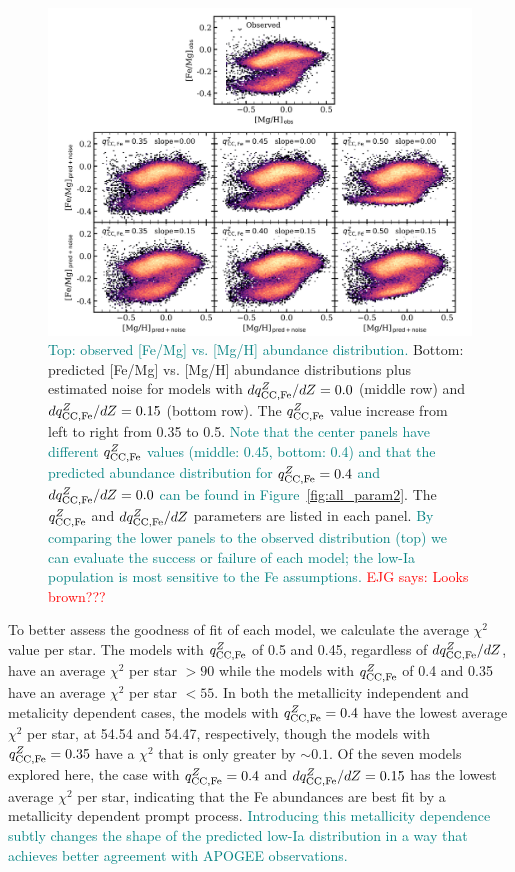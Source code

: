 \documentclass[modern]{aastex631}
\newcommand{\qccFe}{q_{{\rm CC, Fe}}^{Z}}
\newcommand{\dqccFe}{dq_{{\rm CC, Fe}}^{Z}/dZ}
\newcommand{\ejg}[1]{\textcolor{red}{EJG says: #1}}
\newcommand{\add}[1]{\textcolor{teal}{#1}}
\begin{document}
\begin{figure}[htb!]
    \centering
    \includegraphics[width=\textwidth]{Paper/Figures/qccFe_FeMgpred.pdf}
    \caption{\add{Top: observed [Fe/Mg] vs. [Mg/H] abundance distribution.} Bottom: predicted [Fe/Mg] vs. [Mg/H] abundance distributions plus estimated noise for models with $\dqccFe=0.0$ (middle row) and $\dqccFe=0.15$ (bottom row). The $\qccFe$ value increase from left to right from 0.35 to 0.5. \add{Note that the center panels have different $\qccFe$ values (middle: 0.45, bottom: 0.4) and that the predicted abundance distribution for $\qccFe=0.4$ and $\dqccFe=0.0$ can be found in Figure~\ref{fig:all_param2}}. The $\qccFe$ and $\dqccFe$ parameters are listed in each panel. \add{By comparing the lower panels to the observed distribution (top) we can evaluate the success or failure of each model; the low-Ia population is most sensitive to the Fe assumptions.} \ejg{Looks brown???}}
    \label{fig:qccFe_FeMgpred}
\end{figure}

To better assess the goodness of fit of each model, we calculate the average $\chi^2$ value per star. The models with $\qccFe$ of 0.5 and 0.45, regardless of $\dqccFe$, have an average $\chi^2$ per star $>90$ while the models with $\qccFe$ of 0.4 and 0.35 have an average $\chi^2$ per star $< 55$. In both the metallicity independent and metalicity dependent cases, the models with $\qccFe=0.4$ have the lowest average $\chi^2$ per star, at 54.54 and 54.47, respectively, though the models with $\qccFe=0.35$ have a $\chi^2$ that is only greater by $\sim0.1$. Of the seven models explored here, the case with $\qccFe=0.4$ and $\dqccFe=0.15$ has the lowest average $\chi^2$ per star, indicating that the Fe abundances are best fit by a metallicity dependent prompt process. \add{Introducing this metallicity dependence subtly changes the shape of the predicted low-Ia distribution in a way that achieves better agreement with APOGEE observations.}
\end{document}
